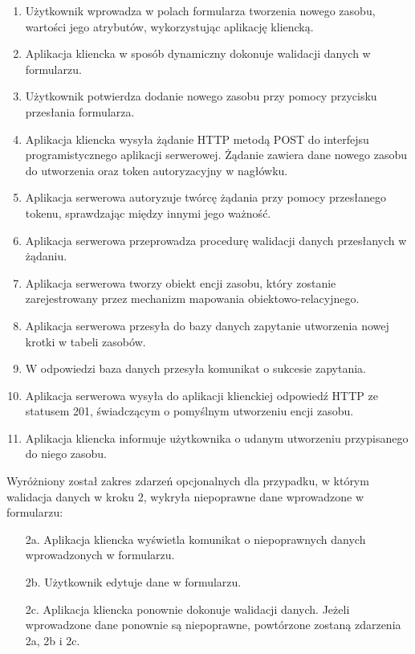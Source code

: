 \begin{enumerate}
    \item Użytkownik wprowadza w polach formularza tworzenia nowego zasobu, wartości jego atrybutów, wykorzystując aplikację kliencką.
    \item Aplikacja kliencka w sposób dynamiczny dokonuje walidacji danych w formularzu.
    \item Użytkownik potwierdza dodanie nowego zasobu przy pomocy przycisku przesłania formularza.
    \item Aplikacja kliencka wysyła żądanie HTTP metodą POST do interfejsu programistycznego aplikacji serwerowej. Żądanie zawiera dane nowego zasobu do utworzenia oraz token autoryzacyjny w nagłówku.
    \item Aplikacja serwerowa autoryzuje twórcę żądania przy pomocy przesłanego tokenu, sprawdzając między innymi jego ważność.
    \item Aplikacja serwerowa przeprowadza procedurę walidacji danych przesłanych w żądaniu.
    \item Aplikacja serwerowa tworzy obiekt encji zasobu, który zostanie zarejestrowany przez mechanizm mapowania obiektowo-relacyjnego.
    \item Aplikacja serwerowa przesyła do bazy danych zapytanie utworzenia nowej krotki w tabeli zasobów.
    \item W odpowiedzi baza danych przesyła komunikat o sukcesie zapytania.
    \item Aplikacja serwerowa wysyła do aplikacji klienckiej odpowiedź HTTP ze statusem 201, świadczącym o pomyślnym utworzeniu encji zasobu.
    \item Aplikacja kliencka informuje użytkownika o udanym utworzeniu przypisanego do niego zasobu.
\end{enumerate}

Wyróżniony został zakres zdarzeń opcjonalnych dla przypadku, w którym walidacja danych w kroku 2, wykryła niepoprawne dane wprowadzone w formularzu:

\begin{enumerate}
    \item [2a.] Aplikacja kliencka wyświetla komunikat o niepoprawnych danych wprowadzonych w formularzu.
    \item [2b.] Użytkownik edytuje dane w formularzu.
    \item [2c.] Aplikacja kliencka ponownie dokonuje walidacji danych. Jeżeli wprowadzone dane ponownie są niepoprawne, powtórzone zostaną zdarzenia 2a, 2b i 2c.
\end{enumerate}

